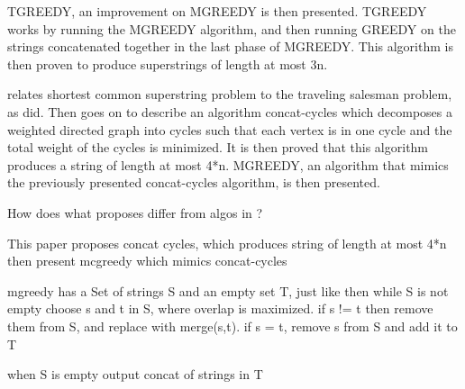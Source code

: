 \documentclass[letterpaper,11pt,titlepage]{article}
\begin{document}
TGREEDY, an improvement on MGREEDY is then presented.  TGREEDY works by running the MGREEDY algorithm, and then running GREEDY on the strings concatenated together in the last phase of MGREEDY.  This algorithm is then proven to produce superstrings of length at most 3n.  



\cite{blum1991linear} relates shortest common superstring problem to the traveling salesman problem, as \cite{turner1989approximation} did.  Then \cite{blum1991linear} goes on to describe an algorithm concat-cycles which decomposes a weighted directed graph into cycles such that each vertex is in one cycle and the total weight of the cycles is minimized.  It is then proved that this algorithm produces a string of length at most 4*n.  MGREEDY, an algorithm that mimics the previously presented concat-cycles algorithm, is then presented.

How does what \cite{li1990towards} proposes differ from algos in \cite{tarhio1988greedy}\cite{turner1989approximation}?


This paper proposes concat cycles, which produces string of length at most 4*n
then present mcgreedy which mimics concat-cycles

mgreedy has a Set of strings S and an empty set T, just like \cite{li1990towards}
then while S is not empty choose s and t in S, where overlap is maximized.  if s != t
then remove them from S, and replace with merge(s,t).  if s = t, remove s from S and add it to T

when S is empty output concat of strings in T

\newpage
{
  \small 
  
  
}
\end{document}
